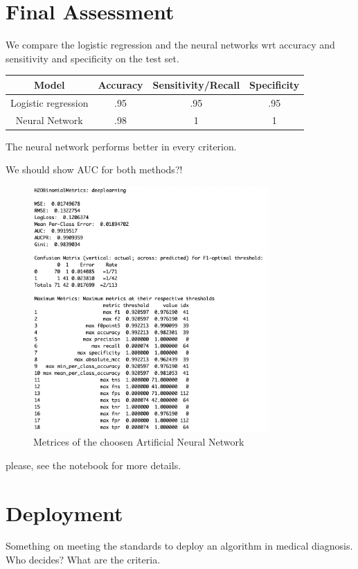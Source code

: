 \documentclass[]{article}
\begin{document}
\section{Final Assessment}\label{final-assessment}

We compare the logistic regression and the neural networks wrt accuracy
and sensitivity and specificity on the test set.

\begin{center}
 \begin{tabular}{|c | c |  c | c|} 
 \hline
 Model & Accuracy & Sensitivity/Recall & Specificity \\ [0.5ex] 
 \hline
 Logistic regression & .95 & .95 & .95 \\ 
 \hline
 Neural Network & .98 & 1 & 1 \\
 \hline
\end{tabular}
\end{center}

The neural network performs better in every criterion.

We should show AUC for both methods?!

\begin{figure}
    \centering
    \includegraphics[width=0.8\textwidth]{images/h2o_model_performance.png}
    \caption{Metrices of the choosen Artificial Neural Network}
    \label{fig:h2o_model_performance}
\end{figure}

please, see the notebook for more details.

\section{Deployment}\label{deployment}

Something on meeting the standards to deploy an algorithm in medical
diagnosis. Who decides? What are the criteria.

\renewcommand\refname{References}

\end{document}
